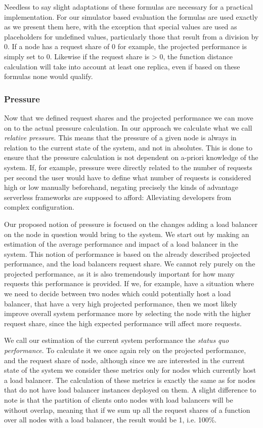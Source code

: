 Needless to say slight adaptations of these formulas are necessary for a practical implementation.
For our simulator based evaluation the formulas are used exactly as we present them here, with the exception that special values are used as placeholders for undefined values, particularly those that result from a division by 0.
If a node has a request share of 0 for example, the projected performance is simply set to 0.
Likewise if the request share is > 0, the function distance calculation will take into account at least one replica, even if based on these formulas none would qualify.


\subsubsection{Pressure}
Now that we defined request shares and the projected performance we can move on to the actual pressure calculation.
In our approach we calculate what we call \textit{relative pressure}.
This means that the pressure of a given node is always in relation to the current state of the system, and not in absolutes.
This is done to ensure that the pressure calculation is not dependent on a-priori knowledge of the system.
If, for example, pressure were directly related to the number of requests per second the user would have to define what number of requests is considered high or low manually beforehand, negating precisely the kinds of advantage serverless frameworks are supposed to afford: Alleviating developers from complex configuration.

Our proposed notion of pressure is focused on the changes adding a load balancer on the node in question would bring to the system.
We start out by making an estimation of the average performance and impact of a load balancer in the system.
This notion of performance is based on the already described projected performance, and the load balancers request share.
We cannot rely purely on the projected performance, as it is also tremendously important for how many requests this performance is provided.
If we, for example, have a situation where we need to decide between two nodes which could potentially host a load balancer, that have a very high projected performance, then we most likely improve overall system performance more by selecting the node with the higher request share, since the high expected performance will affect more requests.

We call our estimation of the current system performance the \textit{status quo performance}.
To calculate it we once again rely on the projected performance, and the request share of node, although since we are interested in the current state of the system we consider these metrics only for nodes which currently host a load balancer.
The calculation of these metrics is exactly the same as for nodes that do not have load balancer instances deployed on them.
A slight difference to note is that the partition of clients onto nodes with load balancers will be without overlap, meaning that if we sum up all the request shares of a function over all nodes with a load balancer, the result would be 1, i.e. 100\%.

